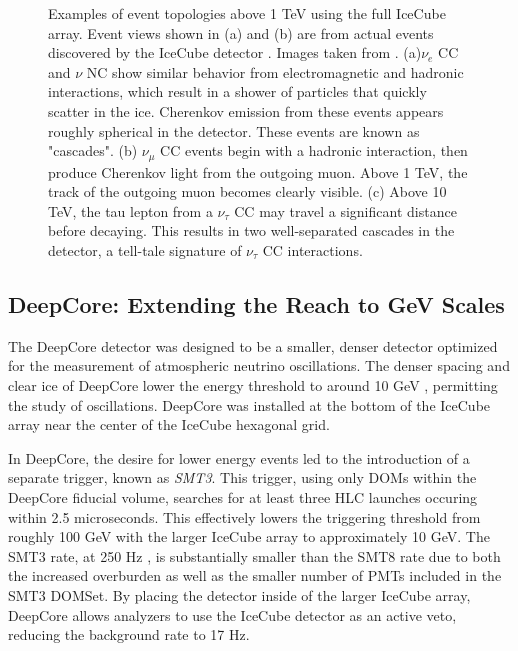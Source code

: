 \begin{figure} 
\centering
    
    
\caption{Examples of event topologies above 1 TeV using the full IceCube array. Event views shown in (a) and (b) are from actual events discovered by the IceCube detector \cite{IceCube-AstroNu}. Images taken from \cite{Thesis-Euler}. (a)$\nu_e$ CC and $\nu$ NC show similar behavior from electromagnetic and hadronic interactions, which result in a shower of particles that quickly scatter in the ice. Cherenkov emission from these events appears roughly spherical in the detector. These events are known as "cascades". (b) $\nu_\mu$ CC events begin with a hadronic interaction, then produce Cherenkov light from the outgoing muon. Above 1 TeV, the track of the outgoing muon becomes clearly visible. (c) Above 10 TeV, the tau lepton from a $\nu_\tau$ CC may travel a significant distance before decaying. This results in two well-separated cascades in the detector, a tell-tale signature of $\nu_\tau$ CC interactions.}
\label{fig:icecube_he_events}
\end{figure}

\label{subsec:deepcore}
\subsection{DeepCore: Extending the Reach to GeV Scales}
The DeepCore detector was designed to be a smaller, denser detector optimized for the measurement of atmospheric neutrino oscillations.
The denser spacing and clear ice of DeepCore lower the energy threshold to around 10 GeV \cite{Description-DeepCore}, permitting the study of oscillations.
DeepCore was installed at the bottom of the IceCube array near the center of the IceCube hexagonal grid.

In DeepCore, the desire for lower energy events led to the introduction of a separate trigger, known as \emph{SMT3}.
This trigger, using only DOMs within the DeepCore fiducial volume, searches for at least three HLC launches occuring within 2.5 microseconds.
This effectively lowers the triggering threshold from roughly 100 GeV with the larger IceCube array to approximately 10 GeV.
The SMT3 rate, at 250 Hz \cite{Description-IceCube, Description-DeepCore}, is substantially smaller than the SMT8 rate due to both the increased overburden as well as the smaller number of PMTs included in the SMT3 DOMSet.
By placing the detector inside of the larger IceCube array, DeepCore allows analyzers to use the IceCube detector as an active veto, reducing the background rate to 17 Hz.

